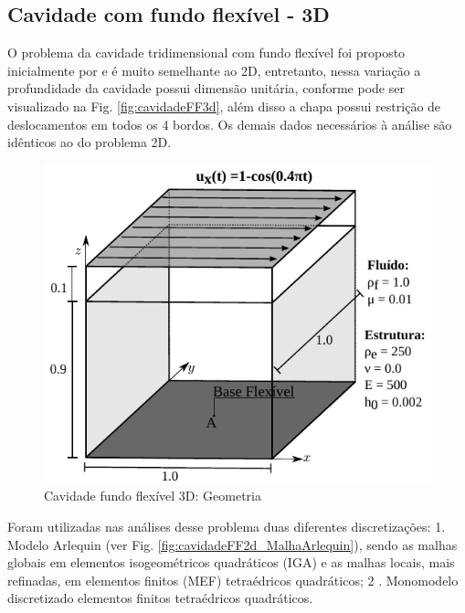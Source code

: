 \documentclass[tese_patricia]{subfiles}
\begin{document}
\subsection{Cavidade com fundo flexível - 3D}

O problema da cavidade tridimensional com fundo flexível foi proposto inicialmente por  e é muito semelhante ao 2D, entretanto, nessa variação a profundidade da cavidade possui dimensão unitária, conforme pode ser visualizado na Fig. \ref{fig:cavidadeFF3d}, além disso a chapa possui restrição de deslocamentos em todos os 4 bordos. Os demais dados necessários à análise são idênticos ao do problema 2D.

\begin{figure}[htb!]
	\centering 
	\includegraphics[scale=0.9,trim=0cm 0cm 0cm 0cm, clip=true]{Imagens/Cap7/cav3d.pdf}	
	\caption{Cavidade fundo flexível 3D: Geometria}
	\label{fig:cavidadeFF3d_Geometria}
\end{figure}

Foram utilizadas nas análises desse problema duas diferentes discretizações: 1. Modelo Arlequin (ver Fig. \ref{fig:cavidadeFF2d_MalhaArlequin}), sendo as malhas globais em elementos isogeométricos quadráticos (IGA) e as malhas locais, mais refinadas, em elementos finitos (MEF) tetraédricos quadráticos; 2 . Monomodelo discretizado elementos finitos tetraédricos quadráticos.
\end{document}
